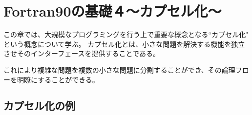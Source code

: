 \chapter{Fortran90の基礎４〜カプセル化〜}
この章では、大規模なプログラミングを行う上で重要な概念となる``カプセル化" という概念について学ぶ。
カプセル化とは、小さな問題を解決する機能を独立させそのインターフェースを提供することである。

これにより複雑な問題を複数の小さな問題に分割することができ、その論理フローを明瞭にすることができる。

\section{カプセル化の例}

